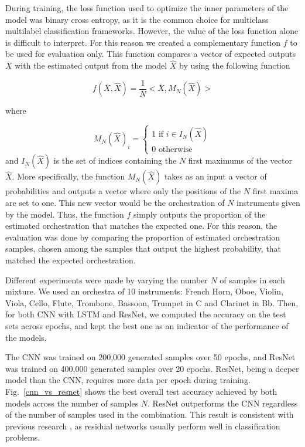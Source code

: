 \documentclass[runningheads,a4paper]{llncs}
\begin{document}
During training, the loss function used to optimize the inner parameters of the model was binary cross entropy, as it is the common choice for multiclass multilabel classification frameworks. However, the value of the loss function alone is difficult to interpret. For this reason we created a complementary function $f$ to be used for evaluation only. This function compares a vector of expected outputs $\overline{X}$ with the estimated output from the model $\hat{X}$ by using the following function

\begin{equation}
f(\overline{X}, \hat{X}) = \frac{1}{N}<\overline{X}, M_N(\hat{X})>
\label{eval}
\end{equation}

where

\begin{equation}
M_N(\hat{X})_i = \left\{\begin{array}{ll}
1 \text{ if } i \in I_N(\hat{X})\\
0 \text{ otherwise}
\end{array}\right.
\label{NMax}
\end{equation}
and $I_N(\hat{X})$ is the set of indices containing the $N$ first maximums of the vector $\hat{X}$. More specifically, the function $M_N(\hat{X})$ takes as an input a vector of probabilities and outputs a vector where only the positions of the $N$ first maxima are set to one. This new vector would be the orchestration of $N$ instruments given by the model. Thus, the function $f$ simply outputs the proportion of the estimated orchestration that matches the expected one.
For this reason, the evaluation was done by comparing the proportion of estimated orchestration samples, chosen among the samples that output the highest probability, that matched the expected orchestration.

Different experiments were made by varying the number $N$ of samples in each mixture. We used an orchestra of 10 instruments: French Horn, Oboe, Violin, Viola, Cello, Flute, Trombone, Bassoon, Trumpet in C and Clarinet in Bb. Then, for both CNN with LSTM and ResNet, we computed the accuracy on the test sets across epochs, and kept the best one as an indicator of the performance of the models.

The CNN was trained on 200,000 generated samples over 50 epochs, and ResNet was trained on 400,000 generated samples over 20 epochs. ResNet, being a deeper model than the CNN, requires more data per epoch during training. Fig.~\ref{cnn_vs_resnet} shows the best overall test accuracy achieved by both models across the number of samples $N$.
ResNet outperforms the CNN regardless of the number of samples used in the combination. This result is consistent with previous research \cite{He15}, as residual networks usually perform well in classification problems.
\end{document}
